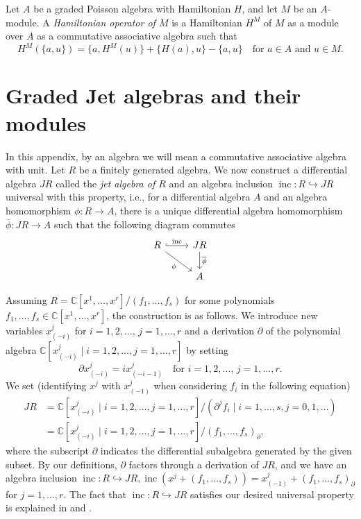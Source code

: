 \documentclass[a4paper, 12pt, reqno]{amsart}
\theoremstyle{remark}
\DeclareMathOperator{\inc}{inc}
\begin{document}
Let $A$ be a graded Poisson algebra with Hamiltonian $H$, and let $M$ be an $A$-module.
A \emph{Hamiltonian operator of $M$} is a Hamiltonian $H^M$ of $M$ as a module over $A$ as a commutative associative algebra such that
\begin{equation*}
  H^M(\{a, u\}) = \{a, H^M(u)\} + \{H(a), u\} - \{a, u\} \quad \text{for $a \in A$ and $u \in M$}.
\end{equation*}

\section{Graded Jet algebras and their modules}
\label{sec:graded-jet-algebras}

In this appendix, by an algebra we will mean a commutative associative algebra with unit.
Let $R$ be a finitely generated algebra.
We now construct a differential algebra $JR$ called the \emph{jet algebra of $R$} and an algebra inclusion $\inc: R \hookrightarrow JR$ universal with this property, i.e., for a differential algebra $A$ and an algebra homomorphism $\phi: R \to A$, there is a unique differential algebra homomorphism $\overline{\phi}: JR \to A$ such that the following diagram commutes
\begin{equation*}
  \begin{tikzcd}
    R \arrow[r, "\inc", hook] \arrow[rd, "\phi"'] & JR \arrow[d, "\overline{\phi}"] \\
    & A
  \end{tikzcd}
\end{equation*}

Assuming $R = \mathbb{C}[x^1, \dots, x^r]/(f_1, \dots, f_s)$ for some polynomials $f_1, \dots, f_s \in \mathbb{C}[x^1, \dots, x^r]$, the construction is as follows.
We introduce new variables $x^j_{(-i)}$ for $i = 1, 2, \dots$, $j = 1, \dots, r$ and a derivation $\partial$ of the polynomial algebra $\mathbb{C}[x^j_{(-i)} \mid i = 1, 2, \dots, j = 1, \dots, r]$ by setting
\begin{equation*}
  \partial x^j_{(-i)} = ix^j_{(-i - 1)} \quad \text{for $i = 1, 2, \dots$, $j = 1, \dots, r$}.
\end{equation*}
We set (identifying $x^j$ with $x^j_{(-1)}$ when considering $f_i$ in the following equation)
\begin{align*}
  JR &= \mathbb{C}[x^j_{(-i)} \mid i = 1, 2, \dots, j = 1, \dots, r]/(\partial^jf_i \mid i = 1, \dots, s, j = 0, 1, \dots) \\
     &= \mathbb{C}[x^j_{(-i)} \mid i = 1, 2, \dots, j = 1, \dots, r]/(f_1, \dots, f_s)_{\partial},
\end{align*}
where the subscript $\partial$ indicates the differential subalgebra generated by the given subset.
By our definitions, $\partial$ factors through a derivation of $JR$, and we have an algebra inclusion $\inc: R \hookrightarrow JR, \inc(x^j + (f_1, \dots, f_s)) = x^j_{(-1)} + (f_1, \dots, f_s)_{\partial}$ for $j = 1, \dots, r$.
The fact that $\inc: R \hookrightarrow JR$ satisfies our desired universal property is explained in \cite[\S2.3]{arakawa_remark_2012} and \cite{ein_jet_2008}.
\end{document}

